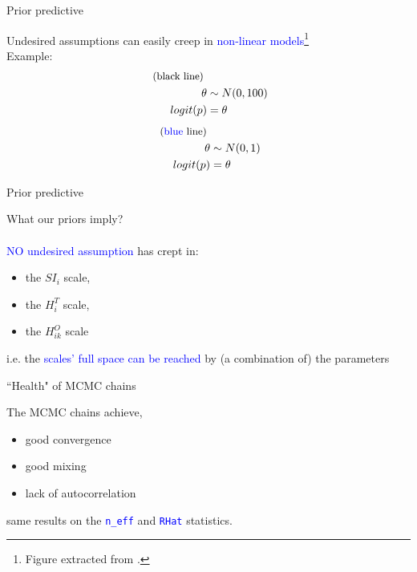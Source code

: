 %
%
\begin{lhframe}[rhgraphic={\texttt{[image: prior\_elicitation.png]}}]
	{Prior predictive}
	
	Undesired assumptions can easily creep in \textcolor{blue}{non-linear models}\footnote{Figure extracted from \citet{Rivera_2021}.} \\
	Example:
	\begin{align*}
		\text{ \small{(\textcolor{black}{black} line)} } & \\
		\theta & \sim N(0,100) \\
		logit(p) & =  \theta
	\end{align*}
	\begin{align*}
		\text{ \small{(\textcolor{blue}{blue} line)} } & \\
		\theta & \sim N(0,1) \\
		logit(p) & =  \theta
	\end{align*}
\end{lhframe}
%
%
\begin{lhframe}[rhgraphic={\texttt{[image: prior\_predictive.pdf]}}]
	{Prior predictive}
	
	What our priors imply? \\ \\
	\textcolor{blue}{NO undesired assumption} has crept in:
	\begin{itemize}
		\item the $SI_{i}$ scale,
		\item the $H^{T}_{i}$ scale,
		\item the $H^{O}_{ik}$ scale
	\end{itemize}
	
	i.e. the \textcolor{blue}{scales' full space can be reached} by (a combination of) the parameters
\end{lhframe}
%
%
\begin{lhframe}[rhgraphic={\texttt{[image: chains1.pdf]}}]
	{``Health" of MCMC chains}
	
	The MCMC chains achieve,
	\begin{itemize}
		\item good convergence
		\item good mixing
		\item lack of autocorrelation
	\end{itemize}
	
	same results on the \textcolor{blue}{ \texttt{n\_eff} } and \textcolor{blue}{ \texttt{RHat} } statistics.
\end{lhframe}
